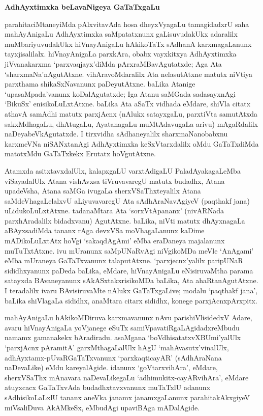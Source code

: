 \begin{center}
{\textbf{\Large AdhAyxtimxka beLavaNigeya GaTaTxgaLu}}
\end{center}

parahitaciMtaneyiMda pAlxvitavAda hosa dheyxVyagaLu tamagidadxrU saha mahAyAnigaLu AdhAyxtimxka saMpatatxnunx gaLisuvudakUkx adaralilx muMbariyuvudakUkx hiVnayAnigaLu hAkikoTaTx sAdhanA karxmagaLanunx tayxjisalilalx. hiVnayAnigaLa parxkAra, obabx vayxkitxya AdhAyxtimxka jiVvanakarxma `parxvaqjayx'diMda pArxraMBavAgutatxde; Aga Ata `sharxmaNa'nAgutAtxne. vihAravoMdaralilx Ata nelasutAtxne matutx niVtiya parxthama shikaSxNavanunx paDeyutAtxne. baLika Atanige `upasaMpada'vanunx koDalAgutatxde; Iga Atanu saMGada sadasayxnAgi `BikuSx' enisikoLuLxtAtxne. baLika Ata aSaTx vidhada eMdare, shiVla citatx athavA samAdhi matutx parxjAcnx (nAlukx satayxgaLu, parxtiVta samutAtxda sakxMdhagaLu, dhAtugaLu, AyatanagaLu muMtAdavugaLa arivu) mAgaRdalilx naDeyabeVkAgutatxde. I tirxvidha sAdhaneyalilx sharxmaNanobabxnu karxmeVNa niSANxtanAgi AdhAyxtimxka keSxVtarxdalilx oMdu GaTaTxdiMda matotxMdu GaTaTxkekx Erutatx hoVgutAtxne.

Atamxda asitxtavxdalUlx, kalapxgaLU varxtAdigaLU PaladAyakagaLeMba viSayadalUlx Atana vishAvxsa tiVruvavaregU matutx budadhx, Atana upadeVsha, Atana saMGa ivugaLa sherxVSaThxteyalilx Atana saMdeVhagaLelalxvU aLiyuvavaregU Ata sAdhAraNavAgiyeV (paqthakf jana) uLidukoLuLxtAtxne. tadanaMtara Ata `sorxVtApananx' (nivARNada parxhAradalilx bidadxvanu) AgutAtxne. baLika, niVti matutx dhAyxnagaLa aBAyxsadiMda tananx rAga devxVSa moVhagaLanunx kaDime mADikoLuLxtAtx hoVgi `sakaqdAgAmi' eMba eraDaneya majalanunx muTuTxtAtxne. ivu mUranunx saMpUNaRvAgi niVgikoMDa meVle `AnAgami' eMba mUraneya GaTaTxvanunx talaputAtxne. `parxjecnx'yalilx paripUNaR sididhxyanunx paDeda baLika, eMdare, hiVnayAnigaLu eNisiruvaMtha parama satayxda BAvaneyanunx sAkASxtakxrisikoMDa baLika, Ata ahaRtanAgutAtxne. I teradalilx ivaru BAvisiruvaMte nAlukx GaTaTxgaLive; modalu `paqthakf jana', baLika shiVlagaLa sididhx, anaMtara citarx sididhx, konege parxjAcnxpArxpitx.

mahAyAnigaLu hAkikoMDiruva karxmavanunx nAvu parishiVlisidedxV Adare, avaru hiVnayAnigaLa yoVjanege eSuTx samiVpavatiRgaLAgidadxreMbudu namamx gamanakekx bAradiradu. asaMgana `boVdhisatatxvXBUmi'yalUlx `parxjAcnx pAramitA' garxMthagaLalUlx hAgU `mahAvasutx'vinalUlx, adhAyxtamx-pUvaRGaTaTxvanunx `parxkaqticayAR' (sAdhAraNana naDevaLike) eMdu kareyalAgide. idanunx `goVtarxvihAra', eMdare, sherxVSaThx mAnavara naDevaLikegaLu `adhimukitx-cayARvihAra', eMdare atuyxcacx GaTaTxvAda budadhxtavxvanunx muTaTxlU adanunx sAdhisikoLaLxlU tananx aneVka janamx janamxgaLanunx parahitakAkxgiyeV miVsaliDuva AkAMkeSx, eMbudAgi upaviBAga mADalAgide.

